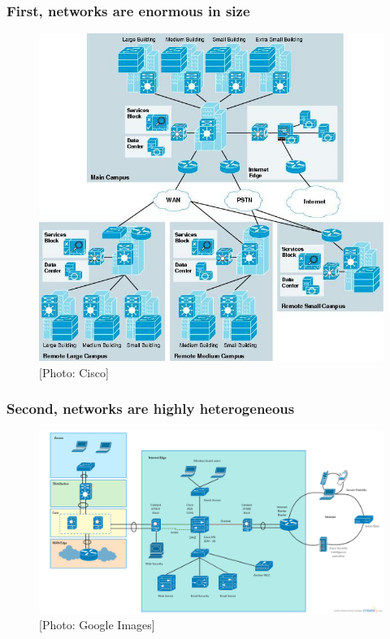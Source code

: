 \documentclass{beamer}
\begin{document}
\begin{frame}
  \frametitle{First, networks are enormous in size}
  \begin{figure}
    \begin{center}
      \includegraphics[scale=0.25]{images/sdn-1}
    \end{center}
    
    \caption{\small{[Photo: Cisco]}}
  \end{figure}
\end{frame}
\begin{frame}
  \frametitle{Second, networks are highly heterogeneous}
  \begin{figure}
    \begin{center}
      \includegraphics[scale=0.25]{images/sdn-2}
    \end{center}
    
    \caption{\small{[Photo: Google Images]}}
  \end{figure}
\end{frame}
\end{document}
